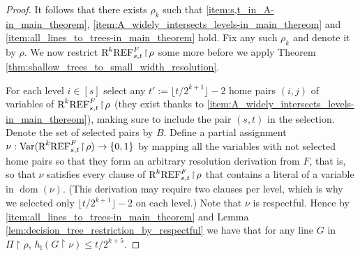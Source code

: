 \documentclass[10pt,a4paper]{article}
\theoremstyle{remark}
\newtheorem*{switching lemma}{Switching Lemma}
\newtheorem*{open problem}{Open Problem}
\theoremstyle{definition}
\DeclareMathOperator{\dom}{dom}
\begin{document}
\begin{proof}
It follows that there exists $\rho_k$ such that \ref{item:s,t_in_A-in_main_theorem}, \ref{item:A_widely_intersects_levels-in_main_thereom} and \ref{item:all_lines_to_trees-in_main_theorem} hold. Fix any such $\rho_k$ and denote it by $\rho$. We now restrict $\textnormal{R}^k\textnormal{REF}^{F}_{s,t} \! \restriction \! \rho$ some more before we apply Theorem \ref{thm:shallow_trees_to_small_width_resolution}.

For each level $i \in [s]$ select any $t' := \lfloor t/2^{k+1} \rfloor - 2$ home pairs $(i,j)$ of variables of $\textnormal{R}^k\textnormal{REF}^{F}_{s,t} \! \restriction \! \rho$ (they exist thanks to  \ref{item:A_widely_intersects_levels-in_main_thereom}), making sure to include the pair $(s,t)$ in the selection. Denote the set of selected pairs by $B$. Define a partial assignment $\nu: \text{Var}(\textnormal{R}^k\textnormal{REF}^{F}_{s,t} \! \restriction \! \rho) \rightarrow \{0,1\}$ by mapping all the variables with not selected home pairs so that they form an arbitrary resolution derivation from $F$, that is, so that $\nu$ satisfies every clause of $\textnormal{R}^k\textnormal{REF}^{F}_{s,t} \! \restriction \! \rho$ that contains a literal of a variable in $\dom(\nu)$. (This derivation may require two clauses per level, which is why we selected only $\lfloor t/2^{k+1} \rfloor - 2$ on each level.) Note that $\nu$ is respectful. Hence by \ref{item:all_lines_to_trees-in_main_theorem} and Lemma \ref{lem:decision_tree_restriction_by_respectful} we have that for any line $G$ in $\Pi \! \restriction \! \rho$, $h_{\text{i}}(G \! \restriction \! \nu) \leq t/2^{k+5}$.


\end{proof}
\end{document}
